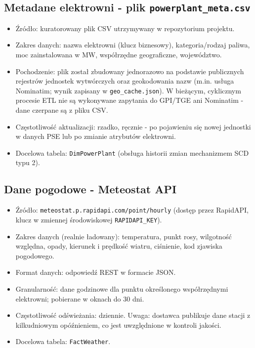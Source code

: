\documentclass[12pt]{article}
\begin{document}
	\subsection{Metadane elektrowni - plik \texttt{powerplant\_meta.csv}}
	\begin{itemize}
		\item Źródło: kuratorowany plik CSV utrzymywany w repozytorium projektu.
		\item Zakres danych: nazwa elektrowni (klucz biznesowy), kategoria/rodzaj paliwa, moc zainstalowana w MW, współrzędne geograficzne, województwo.
		\item Pochodzenie: plik został zbudowany jednorazowo na podstawie publicznych rejestrów jednostek wytwórczych oraz geokodowania nazw (m.in. usługa Nominatim; wynik zapisany w \texttt{geo\_cache.json}). W bieżącym, cyklicznym procesie ETL nie są wykonywane zapytania do GPI/TGE ani Nominatim - dane czerpane są z pliku CSV.
		\item Częstotliwość aktualizacji: rzadko, ręcznie - po pojawieniu się nowej jednostki w danych PSE lub po zmianie atrybutów elektrowni.
		\item Docelowa tabela: \texttt{DimPowerPlant} (obsługa historii zmian mechanizmem SCD typu 2).
	\end{itemize}

	\subsection{Dane pogodowe - Meteostat API}
	\begin{itemize}
		\item Źródło: \texttt{meteostat.p.rapidapi.com/point/hourly} (dostęp przez RapidAPI, klucz w zmiennej środowiskowej \texttt{RAPIDAPI\_KEY}).
		\item Zakres danych (realnie ładowany): temperatura, punkt rosy, wilgotność względna, opady, kierunek i prędkość wiatru, ciśnienie, kod zjawiska pogodowego.
		\item Format danych: odpowiedź REST w formacie JSON.
		\item Granularność: dane godzinowe dla punktu określonego współrzędnymi elektrowni; pobierane w oknach do 30 dni.
		\item Częstotliwość odświeżania: dziennie. Uwaga: dostawca publikuje dane stacji z kilkudniowym opóźnieniem, co jest uwzględnione w kontroli jakości.
		\item Docelowa tabela: \texttt{FactWeather}.
	\end{itemize}
\end{document}
